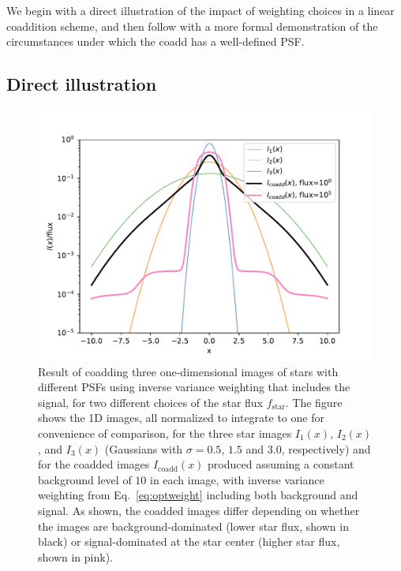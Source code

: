\documentclass{aastex63}
\begin{document}
We begin with a direct illustration of the impact of weighting choices in a linear coaddition scheme, and then follow with a more formal demonstration of the circumstances under which the coadd has a well-defined PSF.

\subsection{Direct illustration}\label{subsec:direct}

\begin{figure}
\begin{center}
\includegraphics[width=5.5in]{figures/coadd_psf.pdf}
 \caption{Result of coadding three one-dimensional images of stars with different PSFs using inverse variance weighting that includes the signal, for two different choices of the star flux $f_\text{star}$.  The figure shows the 1D images, all normalized to integrate to one for convenience of comparison, for the three star images $I_1(x)$, $I_2(x)$, and $I_3(x)$ (Gaussians with $\sigma=0.5$, $1.5$ and $3.0$, respectively) and for the coadded images $I_\text{coadd}(x)$ produced assuming a constant background level of $10$ in each image, with inverse variance weighting from Eq.~\eqref{eq:optweight} including both background and signal.  As shown, the coadded images differ depending on whether the images are background-dominated (lower star flux, shown in black) or signal-dominated at the star center (higher star flux, shown in pink).   } \label{fig:coadd_psf}
\end{center}
 \end{figure}
 
\end{document}
